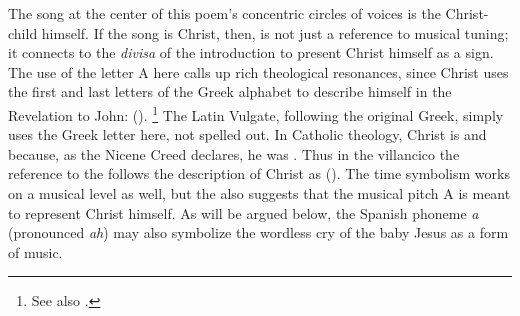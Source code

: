 The song at the center of this poem's concentric circles of voices is the
Christ-child himself.
If the song is Christ, then,  is not
just a reference to musical tuning; it connects to the \emph{divisa} of the
introduction to present Christ himself as a sign.
The use of the letter A here calls up rich theological resonances, since Christ
uses the first and last letters of the Greek alphabet to describe himself in the
Revelation to John:  ().%
    \footnote{See also .}
The Latin Vulgate, following the original Greek, simply uses the Greek letter
\charAlpha{} here, not spelled out.
In Catholic theology, Christ is  and 
because, as the Nicene Creed declares, he was .%
    \Autocite
    [42]
    {Catholic:Catechismus1614}
Thus in the villancico the reference to the  follows the
description of Christ as 
().
The time symbolism works on a musical level as well, but the 
also suggests that the musical pitch A is meant to represent Christ himself.
As will be argued below, the Spanish phoneme \emph{a} (pronounced \emph{ah}) may
also symbolize the wordless cry of the baby Jesus as a form of music.

